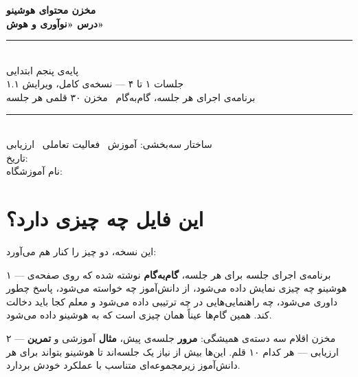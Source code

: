 \documentclass[11pt,a4paper]{article}
\newcommand{\software}{هوشینو}
\newcommand{\payeh}{پایه‌ی پنجم ابتدایی}
\begin{document}
\begin{titlepage}
\centering
\vspace*{3cm}
{\Huge\bfseries\textcolor{maincol}{مخزن محتوای \software}}\\[0.8cm]
{\Huge\bfseries درس «نوآوری و هوش»}\\[1.2cm]
\rule{0.75\textwidth}{1pt}\\[0.8cm]
{\LARGE \payeh}\\[0.5cm]
{\Large جلسات ۱ تا ۴ — نسخه‌ی کامل، ویرایش ۱.۱}\\[1cm]
{\large برنامه‌ی اجرای هر جلسه، گام‌به‌گام \textbar\ مخزن ۳۰ قلمی هر جلسه}\\[1.5cm]
\rule{0.75\textwidth}{1pt}\\[1.5cm]
{\large ساختار سه‌بخشی: آموزش \textbar\ فعالیت تعاملی \textbar\ ارزیابی}\\
\vfill
{\large تاریخ: \makebox[3cm]{\dotfill}}\\[0.4cm]
{\large نام آموزشگاه: \makebox[5cm]{\dotfill}}\\[1cm]
\end{titlepage}

\section{این فایل چه چیزی دارد؟}

این نسخه، دو چیز را کنار هم می‌آورد:

\begin{fasl}{۱ — برنامه‌ی اجرای جلسه}
برای هر جلسه، \textbf{گام‌به‌گام} نوشته شده که روی صفحه‌ی \software{} چه چیزی
نمایش داده می‌شود، از دانش‌آموز چه خواسته می‌شود، پاسخ چطور داوری می‌شود، چه
راهنمایی‌هایی در چه ترتیبی داده می‌شود و معلم کجا باید دخالت کند.
همین گام‌ها عیناً همان چیزی است که به \software{} داده می‌شود.
\end{fasl}

\begin{fasl}{۲ — مخزن اقلام}
سه دسته‌ی همیشگی: \textbf{مرور} جلسه‌ی پیش، \textbf{مثال} آموزشی و
\textbf{تمرین} ارزیابی — هر کدام ۱۰ قلم. این‌ها بیش از نیاز یک جلسه‌اند تا
\software{} بتواند برای هر دانش‌آموز زیرمجموعه‌ای متناسب با عملکرد خودش بردارد.
\end{fasl}
\end{document}
